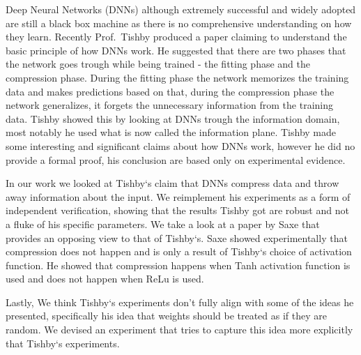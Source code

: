 Deep Neural Networks (DNNs) although extremely successful and widely adopted are
still a black box machine as there is no comprehensive understanding on how they
learn. Recently Prof.\ Tishby produced a paper claiming to understand the basic
principle of how DNNs work. He suggested that there are two phases that the
network goes trough while being trained - the fitting phase and the compression
phase. During the fitting phase the network memorizes the training data and
makes predictions based on that, during the compression phase the network
generalizes, it forgets the unnecessary information from the training data.
Tishby showed this by looking at DNNs trough the information domain, most
notably he used what is now called the information plane.
Tishby made some interesting and significant claims about how DNNs work, however
he did no provide a formal proof, his conclusion are based only on experimental
evidence. 

In our work we looked at Tishby`s claim that DNNs compress data and throw away
information about the input. We reimplement his experiments as a form of
independent verification, showing that the results Tishby got are robust and not
a fluke of his specific parameters. We take a look at a paper by Saxe that
provides an opposing view to that of Tishby`s. Saxe showed experimentally that
compression does not happen and is only a result of Tishby`s choice of
activation function. He showed that compression happens when Tanh activation
function is used and does not happen when ReLu is used.

Lastly, We think Tishby`s experiments don't fully align with some of the ideas
he presented, specifically his idea that weights should be treated as if they
are random. We devised an experiment that tries to capture this idea more
explicitly that Tishby`s experiments.
